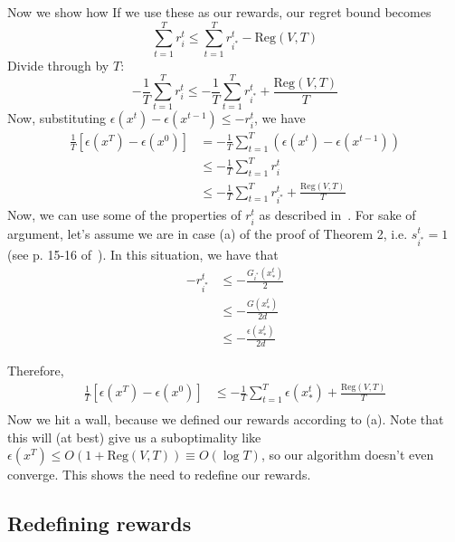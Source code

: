 \documentclass[letterpaper]{article}
\newcommand{\istar}{i^*}
\begin{document}
Now we show how If we use these as our rewards, our regret bound becomes
\begin{equation}
    \sum_{t=1}^T r_i^t \leq \sum_{t=1}^T r_{\istar}^t - \text{Reg}(V,T)
\end{equation}
Divide through by $T$: 
\begin{equation}
    -\frac{1}{T} \sum_{t=1}^T r_i^t \leq -\frac{1}{T}\sum_{t=1}^T r_{\istar}^t + \frac{\text{Reg}(V,T)}{T}
\end{equation}
Now, substituting $\epsilon(x^t) - \epsilon(x^{t-1}) \leq -r_i^t$, we have
\begin{align}
    \frac{1}{T}\left[\epsilon(x^T) - \epsilon(x^0)\right]&= -\frac{1}{T}\sum_{t=1}^T\left(\epsilon(x^t) - \epsilon(x^{t-1})\right)\\
    &\leq -\frac{1}{T} \sum_{t=1}^T r_i^t \\
    &\leq -\frac{1}{T}\sum_{t=1}^T r_{\istar}^t + \frac{\text{Reg}(V,T)}{T}
\end{align}
Now, we can use some of the properties of $r_i^t$ as described in~\cite{salehi2018coordinate}. For sake of argument, let's assume we are in case (a) of the proof of Theorem 2, i.e. $s_{\istar}^t = 1$ (see p. 15-16 of~\cite{salehi2018coordinate}). In this situation, we have that
\begin{align}
    -r_{\istar}^t &\leq -\frac{G_{\istar}(x^t_*)}{2} \\
    &\leq -\frac{G(x^t_*)}{2d} \\
    &\leq -\frac{\epsilon(x^t_*)}{2d}
    \label{eq:reward_subgap}
\end{align}

Therefore,
\begin{align}
    \frac{1}{T}\left[\epsilon(x^T) - \epsilon(x^0)\right] &\leq -\frac{1}{T}\sum_{t=1}^T \epsilon(x^t_*) + \frac{\text{Reg}(V,T)}{T} \\
\end{align}
Now we hit a wall, because we defined our rewards according to (a). Note that this will (at best) give us a suboptimality like $\epsilon(x^T) \leq O\left(1 + \text{Reg}(V,T)\right)\equiv O(\log T)$, so our algorithm doesn't even converge. This shows the need to redefine our rewards.

\subsection{Redefining rewards}
\label{section:proxy_rewards}
\end{document}
